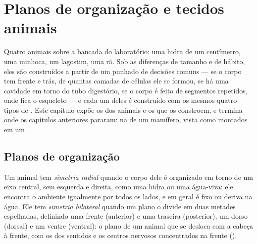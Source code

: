 \chapter{Planos de organização e tecidos animais}\label{ch:b1:body-plans-tissues}

Quatro animais sobre a bancada do laboratório: uma hidra de um
centímetro, uma minhoca, um lagostim, uma rã. Sob as diferenças de
tamanho e de hábito, eles são construídos a partir de um punhado de
decisões comuns --- se o corpo tem frente e trás, de quantas camadas de
células ele se formou, se há uma cavidade em torno do tubo digestório,
se o corpo é feito de segmentos repetidos, onde fica o esqueleto --- e
cada um deles é construído com os mesmos quatro tipos de . Este
capítulo expõe os  dos animais e os  que os
constroem, e termina onde os capítulos anteriores pararam: na  de um mamífero, vista como  montados em um .

\section{Planos de organização}

\begin{definition}\label{def:b1:body-plans-tissues:symmetry}
Um animal tem \emph{simetria radial} quando o
corpo dele é organizado em torno de um eixo central, sem esquerda e
direita, como uma hidra ou uma água-viva: ele encontra o ambiente
igualmente por todos os lados, e em geral é fixo ou deriva na água. Ele
tem \emph{simetria bilateral} quando um plano
o divide em duas metades espelhadas, definindo uma frente (anterior) e
uma traseira (posterior), um dorso (dorsal) e um ventre (ventral): o
plano de um animal que se desloca com a cabeça à frente, com os 
dos sentidos e os centros nervosos concentrados na frente ().
\end{definition}

